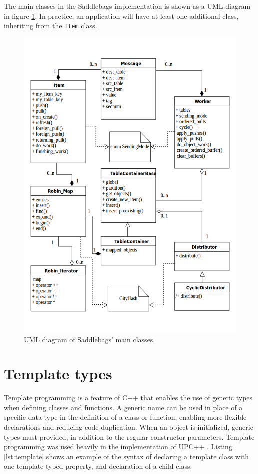 \documentclass{uit-report}
\begin{document}

The main classes in the Saddlebags implementation is shown as a UML diagram in figure \ref{fig:uml}. In practice, an application will have at least one additional class, inheriting from the \texttt{Item} class. 



\begin{figure}[H]
	\centering
	\includegraphics[width=15cm]{illustrations/png/uml.png}
	\caption{UML diagram of Saddlebags' main classes.}
	\label{fig:uml}
\end{figure}


\section{Template types} \label{section:templates}
Template programming is a feature of C++ that enables the use of generic types when defining classes and functions. A generic name can be used in place of a specific data type in the definition of a class or function, enabling more flexible declarations and reducing code duplication. When an object is initialized, generic types must provided, in addition to the regular constructor parameters. Template programming was used heavily in the implementation of UPC++ \cite{upc_language_specification}. Listing \ref{lst:template} shows an example of the syntax of declaring a template class with one template typed property, and declaration of a child class.
\end{document}
